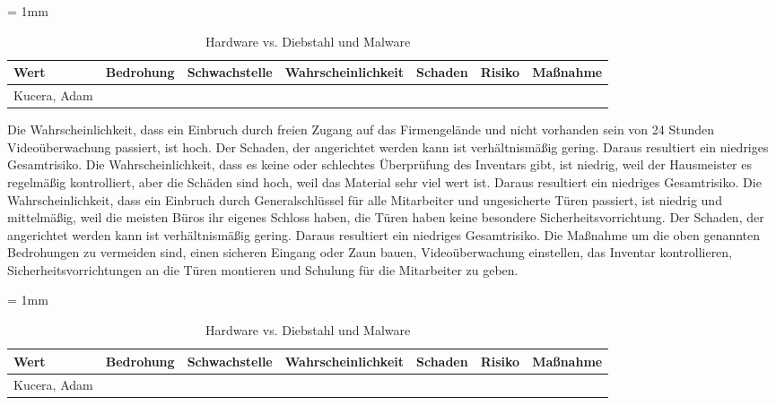 \begin{table}[H]
	\sffamily
	\caption{Hardware vs. Diebstahl und Malware}
	\tabulinesep = 1mm %
	\centering
		\begin{tabu} to 0.9\textwidth {| X[1]  X[1, p] | X[1] | X[1] | X[1] | X[1] | X[1] |}
		\hline
		\textbf{Wert} & \textbf{Bedrohung} & \textbf{Schwachstelle} & \textbf{Wahrscheinlichkeit} & \textbf{Schaden} & \textbf{Risiko} & \textbf{Maßnahme}\\
		\hline 
		Kucera, Adam &  & & & & &\\
		\hline
	\end{tabu}
\end{table}

Die Wahrscheinlichkeit, dass ein Einbruch durch freien Zugang auf das Firmengelände und  nicht vorhanden sein von 24 Stunden Videoüberwachung passiert, ist hoch. Der Schaden, der angerichtet werden kann ist verhältnismäßig gering. Daraus resultiert ein niedriges Gesamtrisiko.
Die Wahrscheinlichkeit, dass es keine oder schlechtes Überprüfung des Inventars gibt, ist niedrig, weil der Hausmeister es regelmäßig kontrolliert, aber die Schäden sind hoch, weil das Material sehr viel wert ist. Daraus resultiert ein niedriges Gesamtrisiko.
Die Wahrscheinlichkeit, dass ein Einbruch durch Generalschlüssel für alle Mitarbeiter und  ungesicherte Türen passiert, ist niedrig und mittelmäßig, weil die meisten Büros ihr eigenes Schloss haben, die Türen haben keine besondere Sicherheitsvorrichtung. Der Schaden, der angerichtet werden kann ist verhältnismäßig gering. Daraus resultiert ein niedriges Gesamtrisiko.
Die Maßnahme um die oben genannten Bedrohungen zu vermeiden sind, einen sicheren Eingang oder Zaun bauen, Videoüberwachung einstellen, das Inventar kontrollieren, Sicherheitsvorrichtungen an die Türen montieren und Schulung für die Mitarbeiter zu geben.

\begin{table}[H]
	\sffamily
	\caption{Hardware vs. Diebstahl und Malware}
	\tabulinesep = 1mm %
	\centering
		\begin{tabu} to 0.9\textwidth {| X[1]  X[1] | X[1] | X[1] | X[1] | X[1] | X[1] |}
		\hline
		\textbf{Wert} & \textbf{Bedrohung} & \textbf{Schwachstelle} & \textbf{Wahrscheinlichkeit} & \textbf{Schaden} & \textbf{Risiko} & \textbf{Maßnahme}\\
		\hline 
		Kucera, Adam &  & & & & &\\
		\hline
	\end{tabu}
\end{table}

